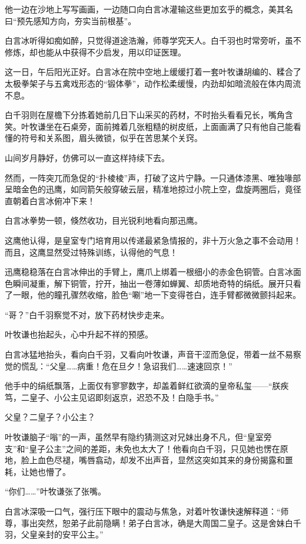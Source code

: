 他一边在沙地上写写画画，一边随口向白言冰灌输这些更加玄乎的概念，美其名曰“预先感知方向，夯实当前根基”。

白言冰听得如痴如醉，只觉得道途浩瀚，师尊学究天人。白千羽也时常旁听，虽不修炼，却也能从中获得不少启发，用以印证医理。

这一日，午后阳光正好。白言冰在院中空地上缓缓打着一套叶牧谦胡编的、糅合了太极拳架子与五禽戏形态的“锻体拳”，动作松柔缓慢，内劲却如暗流般在体内周流不息。

白千羽则在屋檐下分拣着她前几日下山采买的药材，不时抬头看看兄长，嘴角含笑。叶牧谦坐在石桌旁，面前摊着几张粗糙的树皮纸，上面画满了只有他自己能看懂的符号和关系图，眉头微锁，似乎在苦思某个关窍。

山间岁月静好，仿佛可以一直这样持续下去。

然而，一阵突兀而急促的“扑棱棱”声，打破了这片宁静。一只通体漆黑、唯独喙部呈暗金色的迅鹰，如同箭矢般穿破云层，精准地掠过小院上空，盘旋两圈后，竟径直朝着白言冰俯冲下来！

白言冰拳势一顿，倏然收功，目光锐利地看向那迅鹰。

这鹰他认得，是皇室专门培育用以传递最紧急情报的，非十万火急之事不会动用！而且，这鹰显然受过特殊训练，认得他的气息！

迅鹰稳稳落在白言冰伸出的手臂上，鹰爪上绑着一根细小的赤金色铜管。白言冰面色瞬间凝重，解下铜管，拧开，抽出一卷薄如蝉翼、却质地奇特的绢纸。展开只看了一眼，他的瞳孔骤然收缩，脸色“唰”地一下变得苍白，连手臂都微微颤抖起来。

“哥？”白千羽察觉不对，放下药材快步走来。

叶牧谦也抬起头，心中升起不祥的预感。

白言冰猛地抬头，看向白千羽，又看向叶牧谦，声音干涩而急促，带着一丝不易察觉的慌乱：“父皇……病重！危在旦夕！急诏我们……速速回京！”

他手中的绢纸飘落，上面仅有寥寥数字，却盖着鲜红欲滴的皇帝私玺——“朕疾笃，二皇子、小公主见诏即刻返京，迟恐不及！白隐手书。”

父皇？二皇子？小公主？

叶牧谦脑子“嗡”的一声，虽然早有隐约猜测这对兄妹出身不凡，但“皇室旁支”和“皇子公主”之间的差距，未免也太大了！他看向白千羽，只见她也愣在原地，脸上血色尽褪，嘴唇翕动，却发不出声音，显然这突如其来的身份揭露和噩耗，让她也懵了。

“你们……”叶牧谦张了张嘴。

白言冰深吸一口气，强行压下眼中的震动与焦急，对着叶牧谦快速解释道：“师尊，事出突然，恕弟子此前隐瞒！弟子白言冰，确是大周国二皇子。这是舍妹白千羽，父皇亲封的安平公主。”

